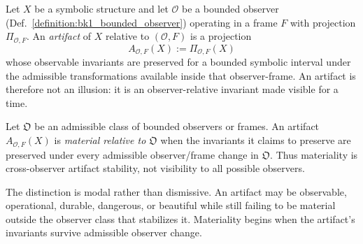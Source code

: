 \begin{definition}
\label{definition:bk8_observer_relative_artifact}
Let $X$ be a symbolic structure and let $\mathcal{O}$ be a bounded observer
(Def.~\ref{definition:bk1_bounded_observer}) operating in a frame $F$ with projection
$\Pi_{\mathcal{O},F}$. An \emph{artifact} of $X$ relative to $(\mathcal{O},F)$ is
a projection
\[
A_{\mathcal{O},F}(X) := \Pi_{\mathcal{O},F}(X)
\]
whose observable invariants are preserved for a bounded symbolic interval under
the admissible transformations available inside that observer-frame. An artifact
is therefore not an illusion: it is an observer-relative invariant made visible
for a time.
\end{definition}
\begin{definition}
\label{definition:bk8_material_projection}
Let $\mathfrak{O}$ be an admissible class of bounded observers or frames. An
artifact $A_{\mathcal{O},F}(X)$ is \emph{material relative to $\mathfrak{O}$} when
the invariants it claims to preserve are preserved under every admissible
observer/frame change in $\mathfrak{O}$. Thus materiality is cross-observer
artifact stability, not visibility to all possible observers.
\end{definition}
\begin{remark}
\label{remark:bk8_artifact_material_boundary}
The distinction is modal rather than dismissive. An artifact may be observable,
operational, durable, dangerous, or beautiful while still failing to be material
outside the observer class that stabilizes it. Materiality begins when the
artifact's invariants survive admissible observer change.
\end{remark}
